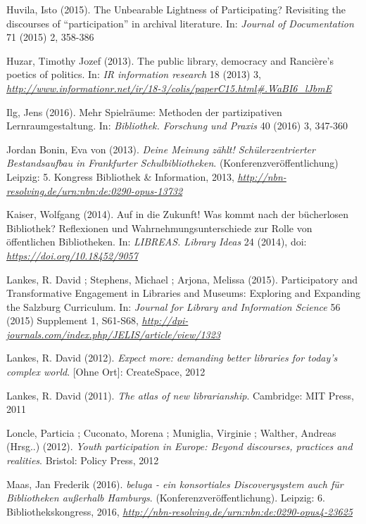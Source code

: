 \documentclass[a4paper,
fontsize=11pt,
oneside,
numbers=noperiodatend,
parskip=half-,
bibliography=totoc,
final
]{scrartcl}
\begin{document}
Huvila, Isto (2015). The Unbearable Lightness of Participating?
Revisiting the discourses of \enquote{participation} in archival
literature. In: \emph{Journal of Documentation} 71 (2015) 2, 358-386

Huzar, Timothy Jozef (2013). The public library, democracy and
Rancière's poetics of politics. In: \emph{IR information research} 18
(2013) 3,
\href{http://www.informationr.net/ir/18-3/colis/paperC15.html\#.WaBI6_lJbmE}{\emph{http://www.informationr.net/ir/18-3/colis/paperC15.html\#.WaBI6\_lJbmE}}

Ilg, Jens (2016). Mehr Spielräume: Methoden der partizipativen
Lernraumgestaltung. In: \emph{Bibliothek. Forschung und Praxis} 40
(2016) 3, 347-360

Jordan Bonin, Eva von (2013). \emph{Deine Meinung zählt!
Schülerzentrierter Bestandsaufbau in Frankfurter Schulbibliotheken}.
(Konferenzveröffentlichung) Leipzig: 5. Kongress Bibliothek \&
Information, 2013,
\href{http://nbn-resolving.de/urn:nbn:de:0290-opus-13732}{\emph{http://nbn-resolving.de/urn:nbn:de:0290-opus-13732}}

Kaiser, Wolfgang (2014). Auf in die Zukunft! Was kommt nach der
bücherlosen Bibliothek? Reflexionen und Wahrnehmungsunterschiede zur
Rolle von öffentlichen Bibliotheken. In: \emph{LIBREAS. Library Ideas}
24 (2014), doi:
\href{http://dx.doi.org/10.18452/9057}{\emph{https://doi.org/10.18452/9057}}

Lankes, R. David ; Stephens, Michael ; Arjona, Melissa (2015).
Participatory and Transformative Engagement in Libraries and Museums:
Exploring and Expanding the Salzburg Curriculum. In: \emph{Journal for
Library and Information Science} 56 (2015) Supplement 1, S61-S68,
\href{http://dpi-journals.com/index.php/JELIS/article/view/1323}{\emph{http://dpi-journals.com/index.php/JELIS/article/view/1323}}

Lankes, R. David (2012). \emph{Expect more: demanding better libraries
for today's complex world}. {[}Ohne Ort{]}: CreateSpace, 2012

Lankes, R. David (2011). \emph{The atlas of new librarianship}.
Cambridge: MIT Press, 2011

Loncle, Particia ; Cuconato, Morena ; Muniglia, Virginie ; Walther,
Andreas (Hrsg..) (2012). \emph{Youth participation in Europe: Beyond
discourses, practices and realities}. Bristol: Policy Press, 2012

Maas, Jan Frederik (2016). \emph{beluga - ein konsortiales
Discoverysystem auch für Bibliotheken außerhalb Hamburgs}.
(Konferenzveröffentlichung). Leipzig: 6. Bibliothekskongress, 2016,
\href{http://nbn-resolving.de/urn:nbn:de:0290-opus4-23625}{\emph{http://nbn-resolving.de/urn:nbn:de:0290-opus4-23625}}
\end{document}
